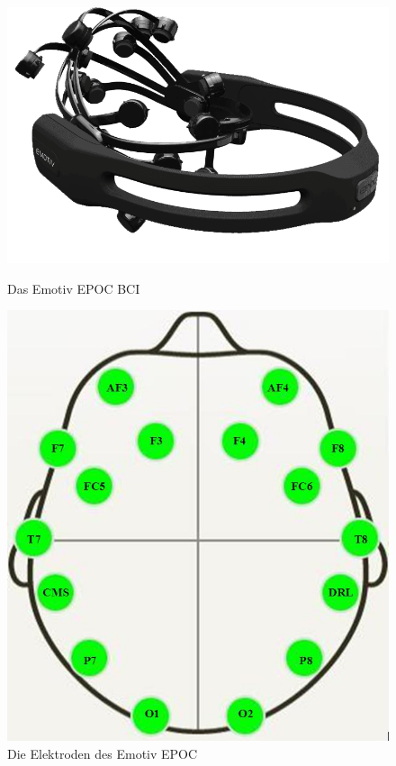 \begin{figure}[ht]
\centering
\begin{minipage}[b]{0.45\linewidth}	
\includegraphics[scale=0.3]{images/emotivEpoc.png}
\caption{Das Emotiv EPOC \acs{BCI}}
\label{EmotivEPOC}
\end{minipage}
\quad
\begin{minipage}[b]{0.45\linewidth}
\includegraphics[scale=0.3]{images/emotivMap.jpg}
\caption{Die Elektroden des Emotiv EPOC}
\label{EmotivMAP}
\end{minipage}
\end{figure}








